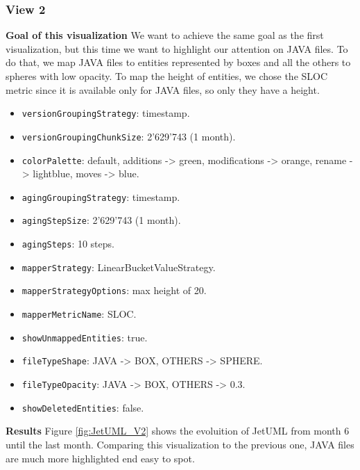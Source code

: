 \subsubsection*{View 2}
\textbf{Goal of this visualization}
We want to achieve the same goal as the first visualization, but this time we want to highlight our attention on JAVA files. 
To do that, we map JAVA files to entities represented by boxes and all the others to spheres with low opacity. 
To map the height of entities, we chose the SLOC metric since it is available only for JAVA files, so only they have a height. 

\begin{itemize}
    \item \texttt{versionGroupingStrategy}: timestamp.
    \item \texttt{versionGroupingChunkSize}: 2'629'743 (1 month). 
    \item \texttt{colorPalette}: default, additions -> green, modifications -> orange, rename -> lightblue, moves -> blue.
    \item \texttt{agingGroupingStrategy}: timestamp.
    \item \texttt{agingStepSize}: 2'629'743 (1 month).
    \item \texttt{agingSteps}: 10 steps. 
    \item \texttt{mapperStrategy}: LinearBucketValueStrategy.
    \item \texttt{mapperStrategyOptions}: max height of 20.
    \item \texttt{mapperMetricName}: SLOC. 
    \item \texttt{showUnmappedEntities}: true.
    \item \texttt{fileTypeShape}: JAVA -> BOX, OTHERS -> SPHERE. 
    \item \texttt{fileTypeOpacity}: JAVA -> BOX, OTHERS -> 0.3. 
    \item \texttt{showDeletedEntities}: false.
\end{itemize}

\textbf{Results}
Figure \ref{fig:JetUML_V2} shows the evoluition of JetUML from month 6 until the last month. 
Comparing this visualization to the previous one, JAVA files are much more highlighted end easy to spot. 



